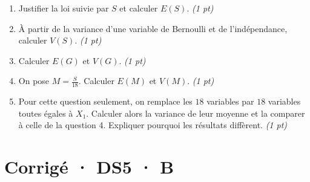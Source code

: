 \begin{enumerate}

\item Justifier la loi suivie par $S$ et calculer $E(S)$. \hfill\textit{(1 pt)}

\item À partir de la variance d'une variable de Bernoulli et de l'indépendance, calculer $V(S)$. \hfill\textit{(1 pt)}

\item Calculer $E(G)$ et $V(G)$. \hfill\textit{(1 pt)}

\item On pose $M=\frac S{18}$. Calculer $E(M)$ et $V(M)$. \hfill\textit{(1 pt)}

\item Pour cette question seulement, on remplace les $18$ variables par $18$ variables toutes égales à $X_1$. Calculer alors la variance de leur moyenne et la comparer à celle de la question 4. Expliquer pourquoi les résultats diffèrent. \hfill\textit{(1 pt)}

\end{enumerate}

\ifprof\clearpage

\section*{Corrigé · DS5 · B}\label{cor:7-4}

